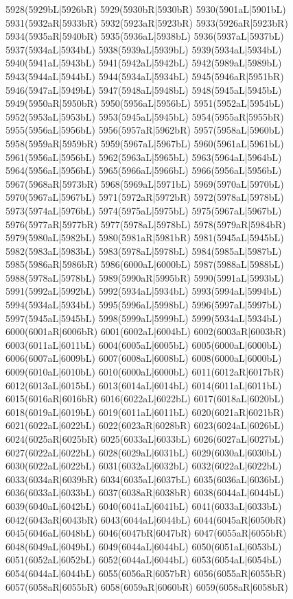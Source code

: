 5928(5929bL|5926bR) 5929(5930bR|5930bR) 5930(5901aL|5901bL) \\5931(5932aR|5933bR) 5932(5923aR|5923bR) 5933(5926aR|5923bR) 5934(5935aR|5940bR) 5935(5936aL|5938bL) 5936(5937aL|5937bL) 5937(5934aL|5934bL) 5938(5939aL|5939bL) 5939(5934aL|5934bL) \\5940(5941aL|5943bL) 5941(5942aL|5942bL) 5942(5989aL|5989bL) 5943(5944aL|5944bL) 5944(5934aL|5934bL) 5945(5946aR|5951bR) 5946(5947aL|5949bL) 5947(5948aL|5948bL) 5948(5945aL|5945bL) \\5949(5950aR|5950bR) 5950(5956aL|5956bL) 5951(5952aL|5954bL) 5952(5953aL|5953bL) 5953(5945aL|5945bL) 5954(5955aR|5955bR) 5955(5956aL|5956bL) 5956(5957aR|5962bR) 5957(5958aL|5960bL) \\5958(5959aR|5959bR) 5959(5967aL|5967bL) 5960(5961aL|5961bL) 5961(5956aL|5956bL) 5962(5963aL|5965bL) 5963(5964aL|5964bL) 5964(5956aL|5956bL) 5965(5966aL|5966bL) 5966(5956aL|5956bL) \\5967(5968aR|5973bR) 5968(5969aL|5971bL) 5969(5970aL|5970bL) 5970(5967aL|5967bL) 5971(5972aR|5972bR) 5972(5978aL|5978bL) 5973(5974aL|5976bL) 5974(5975aL|5975bL) 5975(5967aL|5967bL) \\5976(5977aR|5977bR) 5977(5978aL|5978bL) 5978(5979aR|5984bR) 5979(5980aL|5982bL) 5980(5981aR|5981bR) 5981(5945aL|5945bL) 5982(5983aL|5983bL) 5983(5978aL|5978bL) 5984(5985aL|5987bL) \\5985(5986aR|5986bR) 5986(6000aL|6000bL) 5987(5988aL|5988bL) 5988(5978aL|5978bL) 5989(5990aR|5995bR) 5990(5991aL|5993bL) 5991(5992aL|5992bL) 5992(5934aL|5934bL) 5993(5994aL|5994bL) \\5994(5934aL|5934bL) 5995(5996aL|5998bL) 5996(5997aL|5997bL) 5997(5945aL|5945bL) 5998(5999aL|5999bL) 5999(5934aL|5934bL) 6000(6001aR|6006bR) 6001(6002aL|6004bL) 6002(6003aR|6003bR) \\6003(6011aL|6011bL) 6004(6005aL|6005bL) 6005(6000aL|6000bL) 6006(6007aL|6009bL) 6007(6008aL|6008bL) 6008(6000aL|6000bL) 6009(6010aL|6010bL) 6010(6000aL|6000bL) 6011(6012aR|6017bR) \\6012(6013aL|6015bL) 6013(6014aL|6014bL) 6014(6011aL|6011bL) 6015(6016aR|6016bR) 6016(6022aL|6022bL) 6017(6018aL|6020bL) 6018(6019aL|6019bL) 6019(6011aL|6011bL) 6020(6021aR|6021bR) \\6021(6022aL|6022bL) 6022(6023aR|6028bR) 6023(6024aL|6026bL) 6024(6025aR|6025bR) 6025(6033aL|6033bL) 6026(6027aL|6027bL) 6027(6022aL|6022bL) 6028(6029aL|6031bL) 6029(6030aL|6030bL) \\6030(6022aL|6022bL) 6031(6032aL|6032bL) 6032(6022aL|6022bL) 6033(6034aR|6039bR) 6034(6035aL|6037bL) 6035(6036aL|6036bL) 6036(6033aL|6033bL) 6037(6038aR|6038bR) 6038(6044aL|6044bL) \\6039(6040aL|6042bL) 6040(6041aL|6041bL) 6041(6033aL|6033bL) 6042(6043aR|6043bR) 6043(6044aL|6044bL) 6044(6045aR|6050bR) 6045(6046aL|6048bL) 6046(6047bR|6047bR) 6047(6055aR|6055bR) \\6048(6049aL|6049bL) 6049(6044aL|6044bL) 6050(6051aL|6053bL) 6051(6052aL|6052bL) 6052(6044aL|6044bL) 6053(6054aL|6054bL) 6054(6044aL|6044bL) 6055(6056aR|6057bR) 6056(6055aR|6055bR) \\6057(6058aR|6055bR) 6058(6059aR|6060bR) 6059(6058aR|6058bR) 